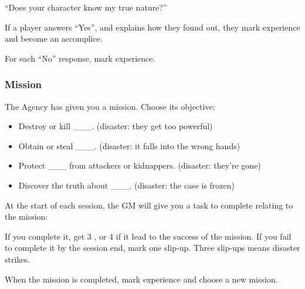 ``Does your character know my true nature?''

If a player answers ``Yes'', and explains how they found out, they mark experience and become an accomplice.

For each ``No'' response, mark experience.

\subsubsection{Mission}\label{sec:Mission}
The Agency has given you a mission. Choose its objective:
\begin{itemize}
\item Destroy or kill \_\_\_. (disaster: they get too powerful)
\item Obtain or steal \_\_\_. (disaster: it falls into the wrong hands)
\item Protect \_\_\_ from attackers or kidnappers. (disaster: they're gone)
\item Discover the truth about \_\_\_. (disaster: the case is frozen)
\end{itemize}

At the start of each session, the GM will give you a task to complete relating to the mission:

If you complete it, get 3 \money , or 4 \money if it lead to the success of the mission. If you fail to complete it by the session end, mark one slip-up. Three slip-ups means disaster strikes.

When the mission is completed, mark experience and choose a new mission.



